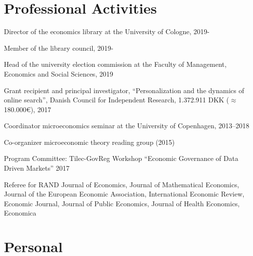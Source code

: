 \documentclass[a4paper]{article}
\renewenvironment{itemize}{
  \begin{list}{}{
    \setlength{\leftmargin}{1.5em}
  }
}{
  \end{list}
}
\begin{document}


\section*{Professional Activities}
\begin{itemize}
\item Director of the economics library at the University of Cologne, 2019-
\item Member of the library council, 2019-
  \item Head of the university election commission at the Faculty of Management, Economics and Social Sciences, 2019
\item Grant recipient and principal investigator, ``Personalization and the dynamics of online search'', Danish Council for Independent Research, 1.372.911 DKK ($\approx$180.000\euro), 2017
\item Coordinator microeconomics seminar at the University of Copenhagen, 2013--2018
\item Co-organizer microeconomic theory reading group (2015)
  \item Program Committee: Tilec-GovReg Workshop ``Economic Governance of Data Driven Markets'' 2017
\item Referee for RAND Journal of Economics, Journal of Mathematical Economics, Journal of the European Economic Association, International Economic Review, Economic Journal, Journal of Public Economics, Journal of Health Economics, Economica
\end{itemize}


\section*{Personal}
\end{document}
